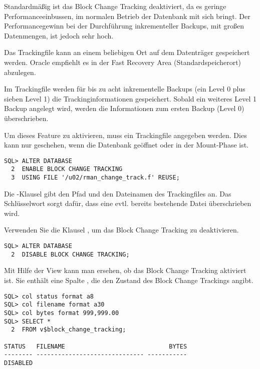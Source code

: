         Standardmäßig ist das Block Change Tracking deaktiviert, da es geringe Performanceeinbussen, im normalen Betrieb der Datenbank mit sich bringt. Der Performancegewinn bei der Durchführung inkrementeller Backups, mit großen Datenmengen, ist jedoch sehr hoch.

        Das Trackingfile kann an einem beliebigen Ort auf dem Datenträger gespeichert werden. Oracle empfiehlt es in der Fast Recovery Area (Standardspeicherort) abzulegen.

        \begin{merke}
          Im Trackingfile werden für bis zu acht inkrementelle Backups (ein Level 0 plus sieben Level 1) die Trackinginformationen gespeichert. Sobald ein weiteres Level 1 Backup angelegt wird, werden die Informationen zum ersten Backup (Level 0) überschrieben.
        \end{merke}
        Um dieses Feature zu aktivieren, muss ein Trackingfile angegeben werden. Dies kann nur geschehen, wenn die Datenbank geöffnet oder in der Mount-Phase ist.
        \begin{lstlisting}[caption={Block Change Tracking
        aktivieren},label=admin1344,language=oracle_sql]
SQL> ALTER DATABASE
  2  ENABLE BLOCK CHANGE TRACKING
  3  USING FILE '/u02/rman_change_track.f' REUSE;
        \end{lstlisting}
        Die -Klausel gibt den Pfad und den Dateinamen des Tracking\-files an. Das Schlüs\-sel\-wort  sorgt dafür, dass eine evtl. bereits bestehende Datei überschrieben wird.

        Verwenden Sie die Klausel , um das Block Change Tracking zu deaktivieren.
        \begin{lstlisting}[caption={Block Change Tracking deaktivieren},label=admin1345,language=oracle_sql]
SQL> ALTER DATABASE
  2  DISABLE BLOCK CHANGE TRACKING;
        \end{lstlisting}
        Mit Hilfe der View  kann man ersehen, ob das Block Change Tracking aktiviert ist. Sie enthält eine Spalte , die den Zustand des Block Change Trackings angibt.
        \begin{lstlisting}[caption={Den Status des Block Change Trackings überprüfen},label=admin1346,language=oracle_sql,alsolanguage=sqlplus]
SQL> col status format a8 
SQL> col filename format a30
SQL> col bytes format 999,999.00
SQL> SELECT *
  2  FROM v$block_change_tracking;

STATUS   FILENAME                             BYTES
-------- ------------------------------ -----------
DISABLED
        \end{lstlisting}
        \begin{literaturinternet}
          \item \cite{BRADV89537}
        \end{literaturinternet}
